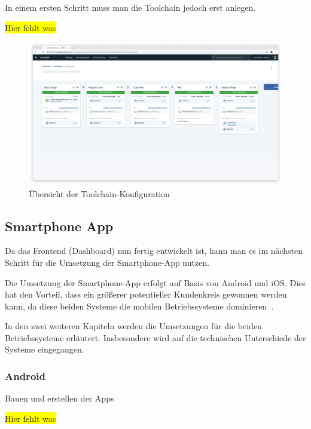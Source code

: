 In einem ersten Schritt muss man die Toolchain jedoch erst anlegen.

\colorbox{yellow}{Hier fehlt was}

\begin{figure}[h]
    \centering
    \includegraphics[width=\textwidth]{images/kapitel_4/toolchain_pipeline.png}
    \caption{Übersicht der Toolchain-Konfiguration}
    \label{fig:umsetzung_toolchain_pipeline_frontend}
\end{figure}

\subsection{Smartphone App}
Da das Frontend (Dashboard) nun fertig entwickelt ist, kann man es im nächsten Schritt für die Umsetzung der
Smartphone-App nutzen.

Die Umsetzung der Smartphone-App erfolgt auf Basis von Android und iOS. Dies hat den Vorteil, dass ein größerer
potentieller Kundenkreis gewonnen werden kann, da diese beiden Systeme die mobilen Betriebssysteme
dominieren~\cite{online_umsetzung_mobileos}.

In den zwei weiteren Kapiteln werden die Umsetzungen für die beiden Betriebssysteme erläutert. Insbesondere wird auf die
technischen Unterschiede der Systeme eingegangen.

\subsubsection{Android}
Bauen und erstellen der Apps

\colorbox{yellow}{Hier fehlt was}

